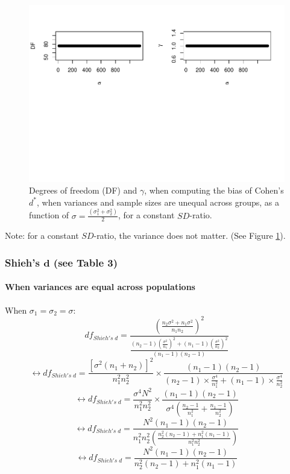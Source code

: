 \documentclass[
  english,
  man,mask]{apa6}
\let\oldparagraph\paragraph
\renewcommand{\paragraph}[1]{\oldparagraph{#1}\mbox{}}
\begin{document}
\begin{figure}
\centering
\includegraphics{SupMat1_files/figure-latex/biascohendprimehetunbalvariance2-1.pdf}
\caption{\label{fig:biascohendprimehetunbalvariance2}Degrees of freedom (DF) and \(\gamma\), when computing the bias of Cohen's \(d^*\), when variances and sample sizes are unequal across groups, as a function of \(\sigma= \frac{(\sigma_1^2+\sigma_2^2)}{2}\), for a constant \(SD\)-ratio.}
\end{figure}

Note: for a constant \(SD\)-ratio, the variance does not matter. (See Figure \ref{fig:biascohendprimehetunbalvariance2}).

\hypertarget{shiehs-bmd-see-table-3}{%
\subsubsection{\texorpdfstring{Shieh's \(\bm{d}\) (see Table 3)}{Shieh's \textbackslash bm\{d\} (see Table 3)}}\label{shiehs-bmd-see-table-3}}

\hypertarget{when-variances-are-equal-across-populations-1}{%
\paragraph{When variances are equal across populations}\label{when-variances-are-equal-across-populations-1}}

When \(\sigma_1=\sigma_2=\sigma\):
\[df_{Shieh's \; d} = \frac{\left( \frac{n_2\sigma^2+n_1\sigma^2}{n_1n_2}\right)^2}{\frac{(n_2-1)\left( \frac{\sigma^2}{n_1}\right)^2+(n_1-1)\left( \frac{\sigma^2}{n_2}\right)^2}{(n_1-1)(n_2-1)}}\]
\[\leftrightarrow df_{Shieh's \; d} = \frac{[\sigma^2(n_1+n_2)]^2}{n_1^2n_2^2} \times \frac{(n_1-1)(n_2-1)}{(n_2-1) \times  \frac{\sigma^4}{n_1^2}+(n_1-1) \times \frac{\sigma^4}{n_2^2}}\]
\[\leftrightarrow df_{Shieh's \; d} = \frac{\sigma^4N^2}{n_1^2n_2^2} \times \frac{(n_1-1)(n_2-1)}{\sigma^4 \left( \frac{n_2-1}{n^2_1}+\frac{n_1-1}{n^2_2}\right) }\]
\[\leftrightarrow df_{Shieh's \; d} = \frac{N^2(n_1-1)(n_2-1)}{n_1^2n_2^2 \left( \frac{n_2^2(n_2-1)+n_1^2(n_1-1)}{n_1^2n_2^2}\right)}\]
\[\leftrightarrow df_{Shieh's \; d} = \frac{N^2(n_1-1)(n_2-1)}{n_2^2(n_2-1)+n_1^2(n_1-1)}\]
\end{document}
